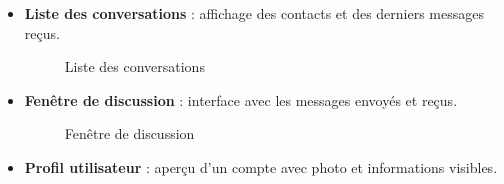\documentclass[12pt]{report}
\begin{document}
\begin{itemize}
	\item \textbf{Liste des conversations} : affichage des contacts et des derniers messages reçus.
	
	\begin{figure}[H]
		\centering
		\begin{minipage}[t]{0.5\textwidth}
			\centering
			\caption{Liste des conversations}
		\end{minipage}
	\end{figure}
	
	\item \textbf{Fenêtre de discussion} : interface avec les messages envoyés et reçus.
	
	\begin{figure}[H]
		\centering
		\begin{minipage}[t]{0.5\textwidth}
			\centering
			\caption{Fenêtre de discussion}
		\end{minipage}
	\end{figure}
	
	\item \textbf{Profil utilisateur} : aperçu d’un compte avec photo et informations visibles.
	

\end{itemize}
\end{document}
